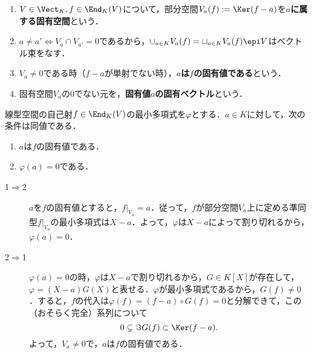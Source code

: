 \documentclass[uplatex, dvipdfmx]{jsreport}
\begin{document}
\begin{definition}\mbox{}
    \begin{enumerate}
        \item $V\in\Vect_K,f\in\End_K(V)$について，部分空間$V_a(f):=\Ker(f-a)$を\textbf{$a$に属する固有空間}という．
        \item $a\ne a'\Leftrightarrow V_{a}\cap V_{a'}=0$であるから，$\cup_{a\in K}V_a(f)=\sqcup_{a\in K}V_a(f)\epi V$はベクトル束をなす．
        \item $V_a\ne 0$である時（$f-a$が単射でない時），\textbf{$a$は$f$の固有値である}という．
        \item 固有空間$V_a$の$0$でない元を，\textbf{固有値$a$の固有ベクトル}という．
    \end{enumerate}
\end{definition}

\begin{proposition}[最小多項式の根が固有値である]\label{prop-minimal-polynomial's-root-is-eigenvalue}
    線型空間の自己射$f\in\End_K(V)$の最小多項式を$\varphi$とする．$a\in K$に対して，次の条件は同値である．
    \begin{enumerate}
        \item $a$は$f$の固有値である．
        \item $\varphi(a)=0$である．
    \end{enumerate}
\end{proposition}
\begin{Proof}\mbox{}
    \begin{description}
        \item[1$\Rightarrow$2] $a$を$f$の固有値とすると，$f|_{V_a}=a$．従って，$f$が部分空間$V_a$上に定める準同型$f|_{V_a}$の最小多項式は$X-a$．よって，$\varphi$は$X-a$によって割り切れるから，$\varphi(a)=0$．
        \item[2$\Rightarrow$1] $\varphi(a)=0$の時，$\varphi$は$X-a$で割り切れるから，$G\in K[X]$が存在して，$\varphi=(X-a)G(X)$と表せる．$\varphi$が最小多項式であるから，$G(f)\ne 0$．すると，$f$の代入は$\varphi(f)=(f-a)\circ G(f)=0$と分解できて，この（おそらく完全）系列について
        \[ 0\subsetneq\Im G(f)\subset\Ker(f-a). \]
        よって，$V_a\ne 0$で，$a$は$f$の固有値である．
    \end{description}
\end{Proof}
\end{document}
